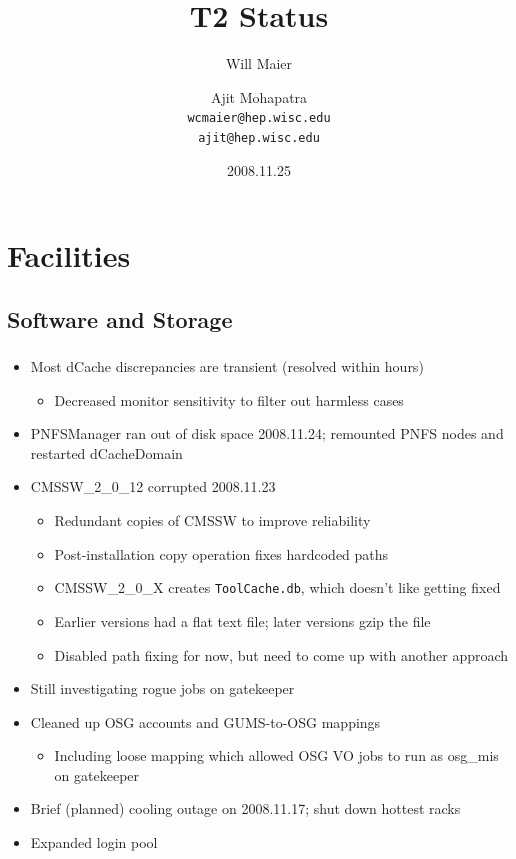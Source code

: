 \documentclass{beamer}
\title{T2 Status}
\author[Maier, Mohapatra]{
    Will Maier \and Ajit Mohapatra\\ 
    {\tt wcmaier@hep.wisc.edu}\\
    {\tt ajit@hep.wisc.edu}}
\institute[Wisconsin]{University of Wisconsin - High Energy Physics}
\date{2008.11.25}
\begin{document}
\begin{frame}
    \titlepage
\end{frame}


\section{Facilities}
\subsection{Software and Storage}
\begin{frame}
\frametitle{}
\begin{itemize}
    \item Most dCache discrepancies are transient (resolved within hours)
    \begin{itemize}
        \item Decreased monitor sensitivity to filter out harmless cases
    \end{itemize}
    \item PNFSManager ran out of disk space 2008.11.24; remounted PNFS nodes and restarted dCacheDomain
    \item CMSSW\_2\_0\_12 corrupted 2008.11.23
    \begin{itemize}
        \item Redundant copies of CMSSW to improve reliability
        \item Post-installation copy operation fixes hardcoded paths
        \item CMSSW\_2\_0\_X creates {\tt ToolCache.db}, which doesn't like getting fixed
        \item Earlier versions had a flat text file; later versions gzip the file
        \item Disabled path fixing for now, but need to come up with another approach
    \end{itemize}
    \item Still investigating rogue jobs on gatekeeper
    \item Cleaned up OSG accounts and GUMS-to-OSG mappings
    \begin{itemize}
        \item Including loose mapping which allowed OSG VO jobs to run as osg\_mis on gatekeeper
    \end{itemize}
    \item Brief (planned) cooling outage on 2008.11.17; shut down hottest racks
    \item Expanded login pool
\end{itemize}
\end{frame}
\end{document}
